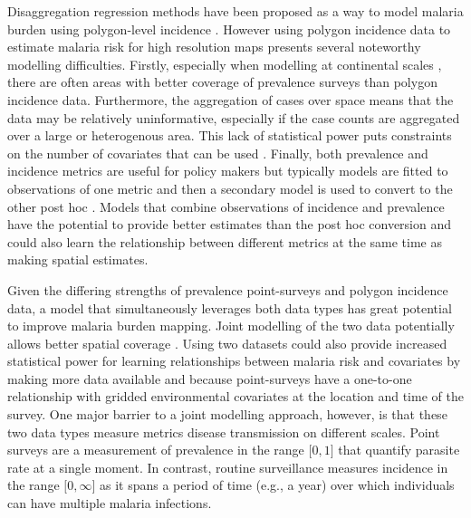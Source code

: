 \documentclass[10pt,letterpaper]{article}
\begin{document}

Disaggregation regression methods have been proposed as a way to model malaria burden using polygon-level incidence \cite{sturrock2014fine, wilson2017pointless, law2018variational, taylor2017continuous, li2012log}.
However using polygon incidence data to estimate malaria risk for high resolution maps presents several noteworthy modelling difficulties. 
Firstly, especially when modelling at continental scales \cite{lancet}, there are often areas with better coverage of prevalence surveys than polygon incidence data.
Furthermore, the aggregation of cases over space means that the data may be relatively uninformative, especially if the case counts are aggregated over a large or heterogenous area.
This lack of statistical power puts constraints on the number of covariates that can be used \cite{sturrock2014fine}.
Finally, both prevalence and incidence metrics are useful for policy makers \cite{cohen2017mapping} but typically models are fitted to observations of one metric and then a secondary model is used to convert to the other post hoc \cite{battlelancet, bhatt2015}.
Models that combine observations of incidence and prevalence have the potential to provide better estimates than the post hoc conversion and could also learn the relationship between different metrics at the same time as making spatial estimates.


Given the differing strengths of prevalence point-surveys and polygon incidence data, a model that simultaneously leverages both data types has great potential to improve malaria burden mapping.
Joint modelling of the two data potentially allows better spatial coverage \cite{sturrock2016mapping}. 
Using two datasets could also provide increased statistical power for learning relationships between malaria risk and covariates by making more data available and because point-surveys have a one-to-one relationship with gridded environmental covariates at the location and time of the survey.
One major barrier to a joint modelling approach, however, is that these two data types measure metrics disease transmission on different scales.
Point surveys are a measurement of prevalence in the range $\lbrack 0, 1\rbrack$ that quantify parasite rate at a single moment.
In contrast, routine surveillance measures incidence in the range $\lbrack 0, \infty\rbrack$ as it spans a period of time (e.g., a year) over which individuals can have multiple malaria infections.
\end{document}
